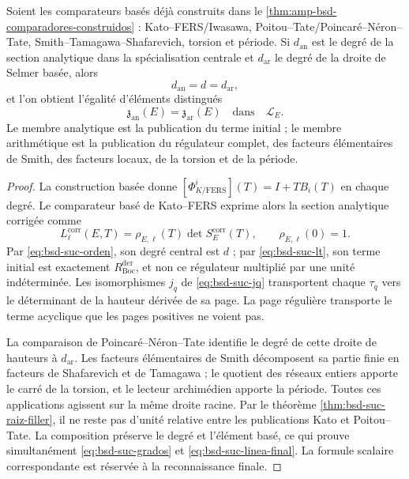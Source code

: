 

\begin{theorem}
\label{thm:bsd-suc-local-global}
Soient les comparateurs basés déjà construits dans le
\cref{thm:amp-bsd-comparadores-construidos} :
Kato--FERS/Iwasawa,
Poitou--Tate/Poincaré--Néron--Tate,
Smith--Tamagawa--Shafarevich, torsion et période.
Si \(d_{\mathrm{an}}\) est le degré de la section analytique dans la
spécialisation centrale et \(d_{\mathrm{ar}}\) le degré de la droite de Selmer
basée, alors
\begin{equation}\label{eq:bsd-suc-grados}
 d_{\mathrm{an}}=d=d_{\mathrm{ar}},
\end{equation}
et l'on obtient l'égalité d'éléments distingués
\begin{equation}\label{eq:bsd-suc-linea-final}
 \mathfrak z_{\mathrm{an}}(E)=\mathfrak z_{\mathrm{ar}}(E)
 \quad\text{dans}\quad\mathcal L_E.
\end{equation}
Le membre analytique est la publication du terme initial ; le membre
arithmétique est la publication du régulateur complet, des facteurs
élémentaires de Smith,
des facteurs locaux, de la torsion et de la période.
\end{theorem}

\begin{proof}
La construction basée donne
\([\Phi_{K/\mathrm{FERS}}^i](T)=I+TB_i(T)\) en chaque degré. Le comparateur
basé de Kato--FERS exprime alors la section analytique corrigée
comme
\begin{equation}\label{eq:bsd-suc-fers}
 L_{\ell}^{\mathrm{corr}}(E,T)
 =\rho_{E,\ell}(T)\det S_E^{\mathrm{corr}}(T),
 \qquad \rho_{E,\ell}(0)=1.
\end{equation}
Par \eqref{eq:bsd-suc-orden}, son degré central est \(d\) ; par
\eqref{eq:bsd-suc-lt}, son terme initial est exactement
\(R_{\mathrm{Boc}}^{\mathrm{der}}\), et non ce régulateur multiplié par une
unité indéterminée. Les isomorphismes \(j_q\) de
\eqref{eq:bsd-suc-jq} transportent chaque \(\tau_q\) vers le déterminant de la
hauteur dérivée de sa page. La page régulière transporte le terme
acyclique que les pages positives ne voient pas.

La comparaison de Poincaré--Néron--Tate identifie le degré de cette droite de
hauteurs à \(d_{\mathrm{ar}}\). Les facteurs élémentaires de Smith décomposent sa partie
finie en facteurs de Shafarevich et de Tamagawa ; le quotient des réseaux
entiers apporte le carré de la torsion, et le lecteur archimédien apporte
la période. Toutes ces applications agissent sur la même droite racine. Par le
théorème \ref{thm:bsd-suc-raiz-filler}, il ne reste pas d'unité relative entre
les publications Kato et Poitou--Tate. La composition préserve le degré et
l'élément basé, ce qui prouve simultanément
\eqref{eq:bsd-suc-grados} et \eqref{eq:bsd-suc-linea-final}. La formule
scalaire correspondante est réservée à la reconnaissance finale.
\end{proof}

